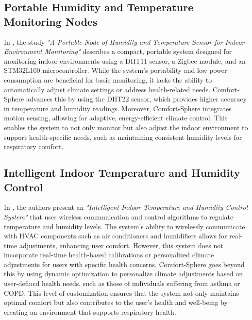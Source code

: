 \documentclass[a4paper]{scrartcl}
\begin{document}
	\subsection{Portable Humidity and Temperature Monitoring Nodes}
	In \cite{paper4}, the study \textit{"A Portable Node of Humidity and Temperature Sensor for Indoor Environment Monitoring"} describes a compact, portable system designed for monitoring indoor environments using a DHT11 sensor, a Zigbee module, and an STM32L100 microcontroller. While the system's portability and low power consumption are beneficial for basic monitoring, it lacks the ability to automatically adjust climate settings or address health-related needs. Comfort-Sphere advances this by using the DHT22 sensor, which provides higher accuracy in temperature and humidity readings. Moreover, Comfort-Sphere integrates motion sensing, allowing for adaptive, energy-efficient climate control. This enables the system to not only monitor but also adjust the indoor environment to support health-specific needs, such as maintaining consistent humidity levels for respiratory comfort.

	\subsection{Intelligent Indoor Temperature and Humidity Control}
	In \cite{paper5}, the authors present an \textit{"Intelligent Indoor Temperature and Humidity Control System"} that uses wireless communication and control algorithms to regulate temperature and humidity levels. The system's ability to wirelessly communicate with HVAC components such as air conditioners and humidifiers allows for real-time adjustments, enhancing user comfort. However, this system does not incorporate real-time health-based calibrations or personalized climate adjustments for users with specific health concerns. Comfort-Sphere goes beyond this by using dynamic optimization to personalize climate adjustments based on user-defined health needs, such as those of individuals suffering from asthma or COPD. This level of customization ensures that the system not only maintains optimal comfort but also contributes to the user's health and well-being by creating an environment that supports respiratory health.
\end{document}
